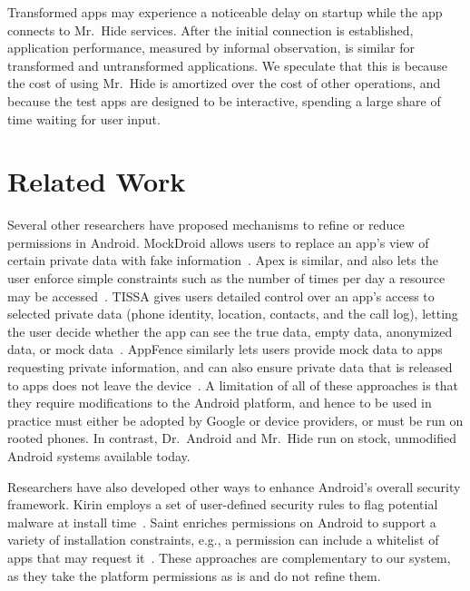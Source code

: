 \documentclass[preprint]{sig-alternate-10pt}
\newcommand{\lib}{Mr.\ Hide\xspace}
\newcommand{\rewriter}{Dr.\ Android\xspace}
\newcommand{\comment}[3][\color{red}]{}%
\newcommand{\jeff}[1]{\comment[\color{green}]{JSF}{#1}}
\begin{document}


Transformed apps may experience a noticeable delay on startup while
the app connects to \lib services.  After the initial connection is
established, application performance, measured by informal observation, is
similar for transformed and untransformed applications.  We speculate that this
is because the cost of using \lib is amortized over the cost of
other operations, and because the test apps are designed to be interactive,
spending a large share of time waiting for user input.


\section{Related Work}

Several other researchers have proposed mechanisms to refine or reduce
permissions in Android. MockDroid allows users to replace an
app's view of certain private data with fake
information~\cite{mockdroid}. Apex is similar, and also lets 
the user enforce simple constraints such as the
number of times per day a resource may be accessed~\cite{apex}. TISSA
gives users detailed control over an app's access to selected private data
(phone identity, location, contacts, and the call log), letting the
user decide whether the app can see the true data, empty data,
anonymized data, or mock data~\cite{zhou2011taming}. AppFence
similarly lets users provide mock data to apps requesting private
information, and can also ensure private data that is released to apps
does not leave the device~\cite{Hornyack:2011:TAD:2046707.2046780}.  A
limitation of all of these approaches is that they require
modifications to the Android platform, and hence to be used in
practice must either be
adopted by Google or device providers, or must be run on rooted
phones. In contrast, \rewriter and \lib run on stock, unmodified
Android systems available today.

Researchers have also developed other ways to enhance Android's
overall security framework. Kirin employs a set of user-defined
security rules to flag potential malware at install
time~\cite{enck2009lightweight}. Saint enriches permissions on Android
to support a variety of installation constraints, e.g., a permission
can include a whitelist of apps that may request
it~\cite{ongtang2009semantically}. These approaches are complementary
to our system, as they take the platform permissions as is and do not
refine them.
\end{document}
